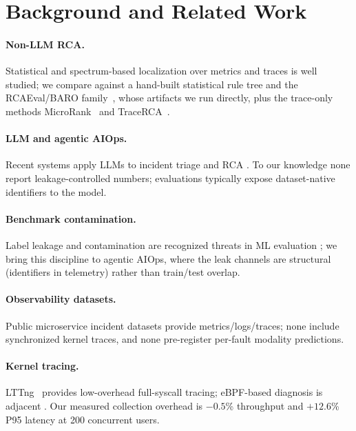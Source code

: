 \section{Background and Related Work}
\label{sec:background}

\paragraph{Non-LLM RCA.} Statistical and spectrum-based localization over metrics and
traces is well studied; we compare against a hand-built statistical rule tree and the
RCAEval/BARO family~\cite{pham2024baro,pham2025rcaeval}, whose artifacts we run
directly, plus the trace-only methods MicroRank~\cite{yu2021microrank} and
TraceRCA~\cite{li2021tracerca}. 

\paragraph{LLM and agentic AIOps.} Recent systems apply LLMs to incident triage and
RCA . To our
knowledge none report leakage-controlled numbers; evaluations typically expose
dataset-native identifiers to the model.

\paragraph{Benchmark contamination.} Label leakage and contamination are recognized
threats in ML evaluation ; we bring this discipline
to agentic AIOps, where the leak channels are structural (identifiers in telemetry)
rather than train/test overlap.

\paragraph{Observability datasets.} Public microservice incident datasets
 provide metrics/logs/traces; none include synchronized
kernel traces, and none pre-register per-fault modality predictions.

\paragraph{Kernel tracing.} LTTng~\cite{desnoyers2006lttng} provides low-overhead
full-syscall tracing; eBPF-based diagnosis is adjacent . Our measured
collection overhead is $-0.5$\% throughput and $+12.6$\% P95 latency at 200 concurrent
users.
